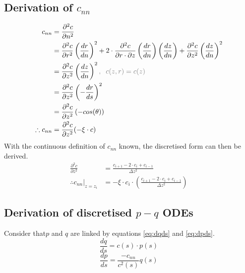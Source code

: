 \documentclass{article}
\begin{document}
\subsection{Derivation of $c_{nn}$}
\begin{align*}
	c_{nn}            & = \frac{\partial^2 c}{\partial n^2}                                                                                                                                                                                                           \\
	                  & =\frac{\partial ^2 c}{\partial r^2}\left(\frac{dr}{dn}\right)^2 + 2\cdot\frac{\partial^2 c}{\partial r\cdot \partial z}\left(\frac{dr}{dn}\right)\left(\frac{dz}{dn}\right) + \frac{\partial ^2 c}{\partial z^2 }\left(\frac{dz}{dn}\right)^2 \\
	                  & =\frac{\partial^2 c}{\partial z^2}\left(\frac{dz}{dn}\right)^2\textcolor{gray}{,\;\;c(z, r)=c(z)}                                                                                                                                             \\
	                  & =\frac{\partial ^2c}{\partial z^2}\left(-\frac{dr}{ds}\right)^2                                                                                                                                                                               \\
	                  & =\frac{\partial^2c}{\partial z^2}\left(-cos(\theta)\right)                                                                                                                                                                                    \\
	\therefore c_{nn} & = \frac{\partial^2 c}{\partial z^2}(-\xi\cdot c)
\end{align*}
With the continuous definition of $c_{nn}$ known, the discretised form can then be derived.
\begin{align*}
	\frac{\partial^2 c}{\partial z^2}      & = \frac{c_{i+1}-2\cdot c_i + c_{i-1}}{\Delta z^2}                                \\
	\therefore \left.c_{nn}\right|_{z=z_i} & = -\xi\cdot c_i\cdot\left(\frac{c_{i+1}-2\cdot c_i + c_{i-1}}{\Delta z^2}\right)
\end{align*}

\subsection{Derivation of discretised $p-q$ ODEs}
Consider that$p$ and $q$ are linked by equations \ref{eq:dqds} and \ref{eq:dpds}.
\begin{equation}
	\label{eq:dqds}
	\frac{dq}{ds}=c(s)\cdot p(s)
\end{equation}
\begin{equation}
	\label{eq:dpds}
	\frac{dp}{ds}=\frac{-c_{nn}}{c^2(s)}q(s)
\end{equation}
\end{document}
